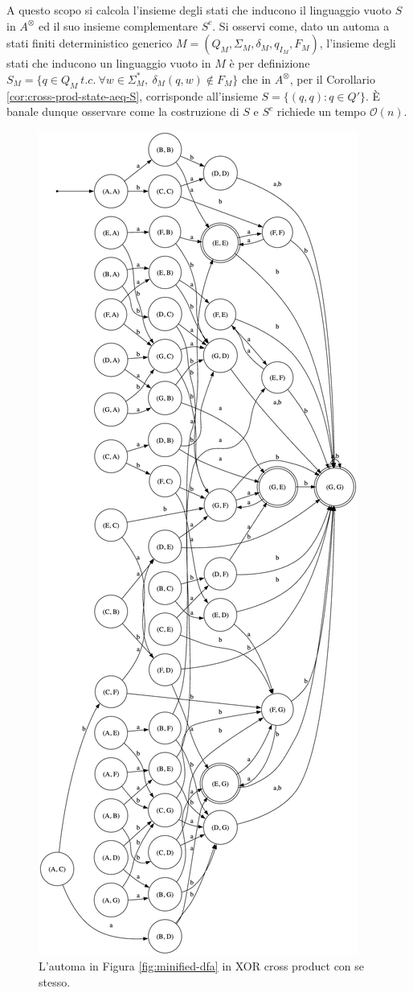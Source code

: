 \documentclass[a4paper,12pt]{report} %
\newcommand{\bigo}[0]{\mathcal{O}}            %
\begin{document}
A questo scopo si calcola l'insieme degli stati che inducono il linguaggio vuoto $S$ in $A^\otimes$ ed il suo 
insieme complementare $S^c$. Si osservi come, dato un automa a stati finiti deterministico generico 
$M = (Q_M, \Sigma_M, \delta_M, q_{I_M}, F_M)$, l'insieme degli stati che inducono un linguaggio vuoto in $M$
è per definizione $S_M = \{q \in Q_M \ t.c. \ \forall w \in \Sigma^*_M, \ \delta_M(q, w) \notin F_M\}$ che in
$A^\otimes$, per il Corollario \ref{cor:cross-prod-state-aeq-S}, corrisponde all'insieme $S = \{ (q, q) : q \in Q' \}$. 
È banale dunque osservare come la costruzione di $S$ e $S^c$ richiede un tempo $\bigo(n)$.

\begin{figure}
  \centering
  \includegraphics[width=0.5\linewidth]{images/dfa_xcp.png}
  \caption{\label{fig:dfa-xcp}L'automa in Figura \ref{fig:minified-dfa} in XOR cross product con se stesso.}
\end{figure}
\end{document}
